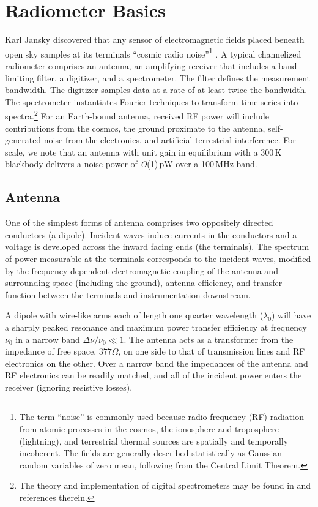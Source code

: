 \section{Radiometer Basics}

Karl Jansky discovered that any sensor of electromagnetic fields placed beneath open sky samples at its terminals ``cosmic radio noise''\footnote{The term ``noise'' is commonly used because radio frequency (RF) radiation from atomic processes in the cosmos, the ionosphere and troposphere (lightning), and terrestrial thermal sources are spatially and temporally incoherent.  The fields are generally described statistically as Gaussian random variables of zero mean, following from the Central Limit Theorem.}  \cite{jansky33}.  A typical channelized radiometer comprises an antenna, an amplifying receiver that includes a band-limiting filter, a digitizer, and a spectrometer.  The filter defines the measurement bandwidth.   The digitizer samples data at a rate of at least twice the bandwidth.  The spectrometer instantiates Fourier techniques to transform time-series into spectra.\footnote{The theory and implementation of digital spectrometers may be found in \cite{TMS17} and references therein.}  For an Earth-bound antenna, received RF power will include contributions from the cosmos, the ground proximate to the antenna,  self-generated noise from the electronics, and artificial terrestrial interference.  For scale, we note that an antenna with unit gain in equilibrium with a 300\,K blackbody delivers a noise power of {\it O}(1)\,pW over a 100\,MHz band.

\subsection{Antenna}
  
One of the simplest forms of antenna comprises two oppositely directed conductors (a dipole).  Incident waves induce currents in the conductors and a voltage is developed across the inward facing ends (the terminals). The spectrum of power measurable at the terminals corresponds to the incident waves, modified by the frequency-dependent electromagnetic coupling of the antenna and surrounding space (including the ground), antenna efficiency, and transfer function between the terminals and instrumentation downstream.
  
A dipole with wire-like arms each of length one quarter wavelength ($\lambda_0$) will have a sharply peaked resonance and maximum power transfer efficiency at frequency $\nu_0$ in a narrow band $\Delta\nu/\nu_0\ll 1$.  The antenna acts as a transformer from the impedance of free space, $377 \Omega$, on one side to that of transmission lines and RF electronics on the other.  Over a narrow band the impedances of the antenna and RF electronics can be readily matched, and all of the incident power enters the receiver (ignoring resistive losses). 
  
